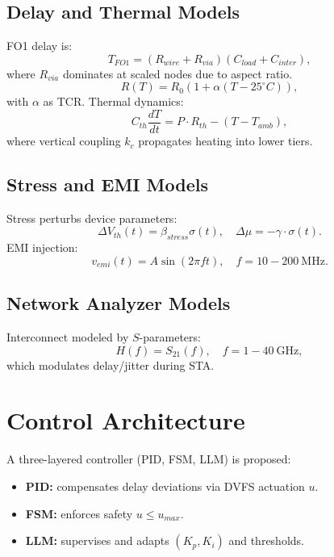 \documentclass[conference]{IEEEtran}
\begin{document}
\subsection{Delay and Thermal Models}
FO1 delay is:
\begin{equation}
T_{FO1} = (R_{wire}+R_{via})(C_{load}+C_{inter}),
\end{equation}
where $R_{via}$ dominates at scaled nodes due to aspect ratio.
\begin{equation}
R(T)=R_0(1+\alpha(T-25^\circ C)),
\end{equation}
with $\alpha$ as TCR. Thermal dynamics:
\begin{equation}
C_{th}\frac{dT}{dt}=P\cdot R_{th}-(T-T_{amb}),
\end{equation}
where vertical coupling $k_c$ propagates heating into lower tiers.

\subsection{Stress and EMI Models}
Stress perturbs device parameters:
\begin{equation}
\Delta V_{th}(t)=\beta_{stress}\sigma(t), \quad \Delta \mu=-\gamma \cdot \sigma(t).
\end{equation}
EMI injection:
\begin{equation}
v_{emi}(t)=A\sin(2\pi f t), \quad f=10{-}200\ \text{MHz}.
\end{equation}

\subsection{Network Analyzer Models}
Interconnect modeled by $S$-parameters:
\begin{equation}
H(f)=S_{21}(f), \quad f=1{-}40\ \text{GHz},
\end{equation}
which modulates delay/jitter during STA.

\section{Control Architecture}
A three-layered controller (PID, FSM, LLM) is proposed:
\begin{itemize}
\item \textbf{PID:} compensates delay deviations via DVFS actuation $u$.
\item \textbf{FSM:} enforces safety $u \leq u_{max}$.
\item \textbf{LLM:} supervises and adapts $(K_p,K_i)$ and thresholds.
\end{itemize}
\end{document}
